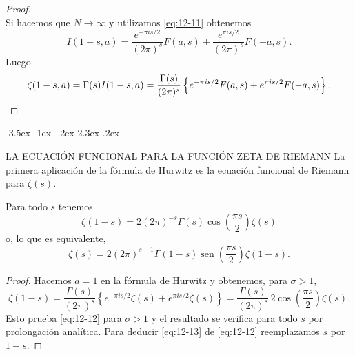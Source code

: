 \documentclass[12pt,a4paper]{book}
\makeatletter
\renewcommand\section{\@startsection{section}{1}{\z@}%
  {-3.5ex \@plus -1ex \@minus -.2ex}%
  {2.3ex \@plus .2ex}%
  {\normalfont\Large\bfseries\raggedright}}
\makeatother
\begin{document}
\begin{proof}
\begin{equation*}
        \end{equation*}
        Si hacemos que $N\to\infty$ y utilizamos \eqref{eq:12-11} obtenemos
        \begin{equation*}
            I(1-s,a)=\frac{e^{-\pi is/2}}{(2\pi)^{s}}F(a,s)+\frac{e^{\pi is/2}}{(2\pi)^{s}}F(-a,s).
        \end{equation*}
        Luego
        \begin{equation*}
            \zeta(1-s,a)=\Gamma(s)I(1-s,a)=\frac{\Gamma(s)}{(2\pi)^{s}}\left\{e^{-\pi is/2}F(a,s)+e^{\pi is/2}F(-a,s)\right\}.\qedhere
        \end{equation*}
    \end{proof}

    \section{LA ECUACIÓN FUNCIONAL PARA LA FUNCIÓN ZETA DE RIEMANN}
    La primera aplicación de la fórmula de Hurwitz es la ecuación funcional de Riemann para
    $\zeta(s)$.

    \begin{teorema}\label{teo:12-7}
        Para todo $s$ tenemos
        \begin{equation}\label{eq:12-12}
            \zeta(1-s)=2(2\pi)^{-s}\Gamma(s)\cos\left(\frac{\pi s}{2}\right)\zeta(s)
        \end{equation}
        o, lo que es equivalente,
        \begin{equation}\label{eq:12-13}
            \zeta(s)=2(2\pi)^{s-1}\Gamma(1-s)\operatorname{sen}\left(\frac{\pi s}{2}\right)\zeta(1-s).
        \end{equation}
    \end{teorema}

    \begin{proof}
        Hacemos $a=1$ en la fórmula de Hurwitz y obtenemos, para $\sigma>1$,
        \begin{equation*}
            \zeta(1-s)=\frac{\Gamma(s)}{(2\pi)^{s}}\left\{e^{-\pi is/2}\zeta(s)+e^{\pi is/2}\zeta(s)\right\}=\frac{\Gamma(s)}{(2\pi)^{s}}\,2\cos\left(\frac{\pi s}{2}\right)\zeta(s).
        \end{equation*}
        Esto prueba \eqref{eq:12-12} para $\sigma>1$ y el resultado se verifica para todo $s$
        por prolongación analítica. Para deducir \eqref{eq:12-13} de \eqref{eq:12-12}
        reemplazamos $s$ por $1-s$.
    \end{proof}
\end{document}
